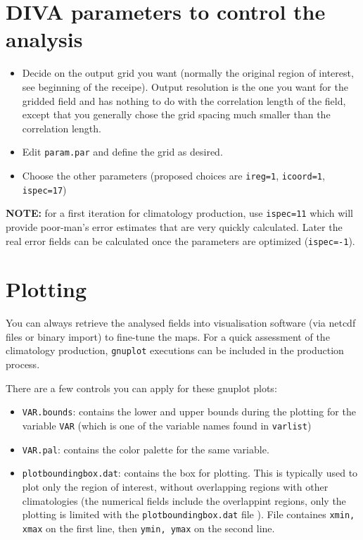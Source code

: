 \documentclass[8pt,a4paper,notitlepage]{book}
\newcommand{\diva}{DIVA}
\begin{document}
\section{\diva {  } parameters to control the analysis}
\begin{itemize}
\item
Decide on the output grid you want (normally the original region of interest, see beginning of the receipe). Output resolution is the one you want for the gridded field and has nothing to do with the correlation length of the field, except that you generally chose the grid spacing much smaller than the correlation length.
\item Edit {\tt param.par} and define the grid as desired.
\item Choose the other parameters (proposed choices are {\tt ireg=1}, {\tt icoord=1}, {\tt ispec=17})
\end{itemize}

{\bf NOTE:} for a first iteration for climatology production, use {\tt ispec=11} which will provide poor-man's error estimates that are very quickly calculated. Later the real error fields 
can be calculated once the parameters are optimized ({\tt ispec=-1}).


\section{Plotting}
You can always retrieve the analysed fields into visualisation software (via netcdf files or binary import) to fine-tune the maps. For a quick assessment of the climatology production, {\tt gnuplot} executions can be included in the production process. 

There are a few controls you can apply for these gnuplot plots:
\begin{itemize}
\item {\tt VAR.bounds}: contains the lower and upper bounds during the plotting for the variable {\tt VAR} (which is one of the variable names found in {\tt varlist}) 
\item {\tt VAR.pal}: contains the color palette for the same variable.
\item {\tt plotboundingbox.dat}: contains the box for plotting. This is typically used to plot only the region of interest, without overlapping regions
with other climatologies (the numerical fields include the overlappint regions, only the plotting is limited with the {\tt plotboundingbox.dat} file ).
File containes {\tt xmin, xmax} on the first line, then {\tt ymin, ymax} on the second line.
\end{itemize}
\end{document}
